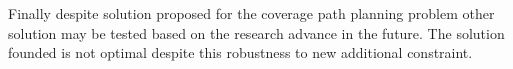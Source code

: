 Finally despite solution proposed for the coverage path planning problem other solution may be tested based on the research advance in the future. The solution founded is not optimal despite this robustness to new additional constraint.







 
%		
